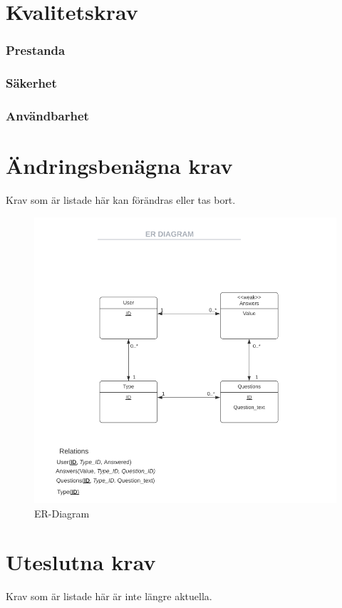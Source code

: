 \documentclass{article}
\begin{document}
    \section{Kvalitetskrav}
    \subsubsection{Prestanda}
    
    \subsubsection{Säkerhet}
    
    \subsubsection{Användbarhet}
    
    \section{Ändringsbenägna krav}
    Krav som är listade här kan förändras eller tas bort.
    
    \begin{figure}[h!]
    
    \includegraphics[width=150mm]{ERDIAGRAM.png}
    \caption{ER-Diagram}
    \end{figure}
    
    \section{Uteslutna krav}
    Krav som är listade här är inte längre aktuella.
    
    

    
        





\end{document}
